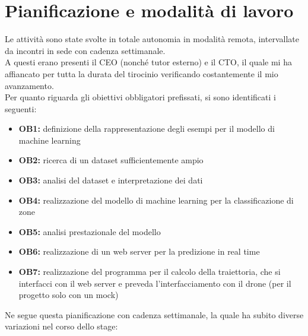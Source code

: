 \section{Pianificazione e modalità di lavoro}
\label{sec:pianificazione}
Le attività sono state svolte in totale autonomia in modalità remota, intervallate da incontri in sede con cadenza settimanale.\\
A questi erano presenti il CEO (nonché tutor esterno) e il CTO, il quale mi ha affiancato per tutta la durata del tirocinio verificando
costantemente il mio avanzamento.\\
Per quanto riguarda gli obiettivi obbligatori prefissati, si sono identificati i seguenti:
\begin{itemize}
		\item \textbf{OB1:} definizione della rappresentazione degli esempi per il modello di machine learning
		\item \textbf{OB2:} ricerca di un dataset sufficientemente ampio
		\item \textbf{OB3:} analisi del dataset e interpretazione dei dati
		\item \textbf{OB4:} realizzazione del modello di machine learning per la classificazione di zone
		\item \textbf{OB5:} analisi prestazionale del modello
		\item \textbf{OB6:} realizzazione di un web server per la predizione in real time
		\item \textbf{OB7:} realizzazione del programma per il calcolo della traiettoria, che si interfacci con il web server e preveda l'interfacciamento con il drone (per il progetto solo con un mock)
\end{itemize}
Ne segue questa pianificazione con cadenza settimanale, la quale ha subito diverse variazioni nel corso dello stage:
